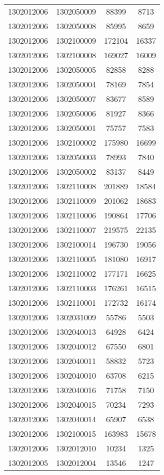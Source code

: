 \begin{longtable}{llcc}
1302012006 & 1302050009 & 88399 & 8713\\
1302012006 & 1302050008 & 85995 & 8659\\
1302012006 & 1302100009 & 172104 & 16337\\
1302012006 & 1302100008 & 169027 & 16009\\
1302012006 & 1302050005 & 82858 & 8288\\
1302012006 & 1302050004 & 78169 & 7854\\
1302012006 & 1302050007 & 83677 & 8589\\
1302012006 & 1302050006 & 81927 & 8366\\
1302012006 & 1302050001 & 75757 & 7583\\
1302012006 & 1302100002 & 175980 & 16699\\
1302012006 & 1302050003 & 78993 & 7840\\
1302012006 & 1302050002 & 83137 & 8449\\
1302012006 & 1302110008 & 201889 & 18584\\
1302012006 & 1302110009 & 201062 & 18683\\
1302012006 & 1302110006 & 190864 & 17706\\
1302012006 & 1302110007 & 219575 & 22135\\
1302012006 & 1302100014 & 196730 & 19056\\
1302012006 & 1302110005 & 181080 & 16917\\
1302012006 & 1302110002 & 177171 & 16625\\
1302012006 & 1302110003 & 176261 & 16515\\
1302012006 & 1302110001 & 172732 & 16174\\
1302012006 & 1302031009 & 55786 & 5503\\
1302012006 & 1302040013 & 64928 & 6424\\
1302012006 & 1302040012 & 67550 & 6801\\
1302012006 & 1302040011 & 58832 & 5723\\
1302012006 & 1302040010 & 63708 & 6215\\
1302012006 & 1302040016 & 71758 & 7150\\
1302012006 & 1302040015 & 70234 & 7293\\
1302012006 & 1302040014 & 65907 & 6538\\
1302012006 & 1302100015 & 163983 & 15678\\
1302012006 & 1302012010 & 10234 & 1325\\
1302012005 & 1302012004 & 13546 & 1247\\

\end{longtable}
